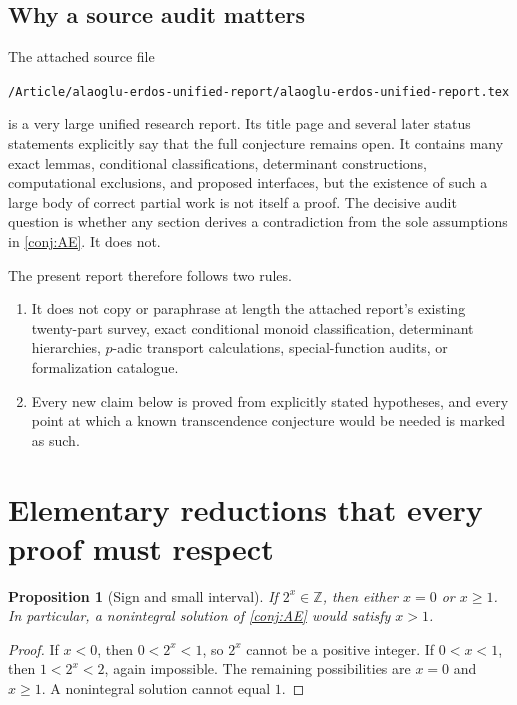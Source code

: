 \documentclass[11pt,oneside]{article}
\newtheorem{proposition}[theorem]{Proposition}
\theoremstyle{definition}
\theoremstyle{remark}
\newcommand{\Z}{\mathbb Z}
\begin{document}
\subsection{Why a source audit matters}

The attached source file
\begin{center}
\texttt{/Article/alaoglu-erdos-unified-report/alaoglu-erdos-unified-report.tex}
\end{center}
is a very large unified research report.  Its title page and several later
status statements explicitly say that the full conjecture remains open.  It
contains many exact lemmas, conditional classifications, determinant
constructions, computational exclusions, and proposed interfaces, but the
existence of such a large body of correct partial work is not itself a proof.
The decisive audit question is whether any section derives a contradiction
from the sole assumptions in \cref{conj:AE}.  It does not.

The present report therefore follows two rules.
\begin{enumerate}[label=(\roman*)]
\item It does not copy or paraphrase at length the attached report's existing
  twenty-part survey, exact conditional monoid classification, determinant
  hierarchies, $p$-adic transport calculations, special-function audits, or
  formalization catalogue.
\item Every new claim below is proved from explicitly stated hypotheses, and
  every point at which a known transcendence conjecture would be needed is
  marked as such.
\end{enumerate}

\section{Elementary reductions that every proof must respect}

\begin{proposition}[Sign and small interval]
\label{prop:sign}
If $2^x\in\Z$, then either $x=0$ or $x\ge 1$.  In particular, a nonintegral
solution of \cref{conj:AE} would satisfy $x>1$.
\end{proposition}

\begin{proof}
If $x<0$, then $0<2^x<1$, so $2^x$ cannot be a positive integer.  If
$0<x<1$, then $1<2^x<2$, again impossible.  The remaining possibilities are
$x=0$ and $x\ge1$.  A nonintegral solution cannot equal $1$.
\end{proof}
\end{document}
